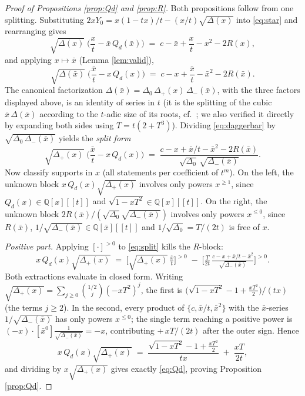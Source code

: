 \documentclass[11pt]{article}
\newcommand{\bx}{\bar x}\newcommand{\by}{\bar y}
\begin{document}
\begin{proof}[Proof of Propositions \ref{prop:Qd} and \ref{prop:R}]
Both propositions follow from one splitting. Substituting $2xY_0 = x(1-tx)/t - (x/t)\sqrt{\Delta(x)}$ into \eqref{eq:star} and rearranging gives
\begin{equation}\label{eq:dagger}
\sqrt{\Delta(x)}\;\Big(\frac{x}{t} - \bx\,Q_d(\bx)\Big) \;=\; c - \bx + \frac{x}{t} - x^{2} - 2R(x),
\end{equation}
and applying $x\mapsto\bx$ (Lemma \ref{lem:valid}),
\begin{equation}\label{eq:daggerbar}
\sqrt{\Delta(\bx)}\;\Big(\frac{\bx}{t} - x\,Q_d(x)\Big) \;=\; c - x + \frac{\bx}{t} - \bx^{2} - 2R(\bx).
\end{equation}
The canonical factorization $\Delta(\bx) = \Delta_0\,\Delta_+(x)\,\Delta_-(\bx)$, with the three factors displayed above, is an identity of series in $t$ (it is the splitting of the cubic $\bx\,\Delta(\bx)$ according to the $t$-adic size of its roots, cf.\ \cite[\S2.2]{BM05}; we also verified it directly by expanding both sides using $T=t(2+T^3)$). Dividing \eqref{eq:daggerbar} by $\sqrt{\Delta_0\,\Delta_-(\bx)}$ yields the \emph{split form}
\begin{equation}\label{eq:split}
\sqrt{\Delta_+(x)}\;\Big(\frac{\bx}{t} - x\,Q_d(x)\Big) \;=\; \frac{c - x + \bx/t - \bx^{2} - 2R(\bx)}{\sqrt{\Delta_0}\,\sqrt{\Delta_-(\bx)}}.
\end{equation}
Now classify supports in $x$ (all statements per coefficient of $t^m$). On the left, the unknown block $x\,Q_d(x)\sqrt{\Delta_+(x)}$ involves only powers $x^{\ge1}$, since $Q_d(x)\in\mathbb{Q}[x][[t]]$ and $\sqrt{1-xT^2}\in\mathbb{Q}[x][[t]]$. On the right, the unknown block $2R(\bx)/(\sqrt{\Delta_0}\sqrt{\Delta_-(\bx)})$ involves only powers $x^{\le0}$, since $R(\bx)$, $1/\sqrt{\Delta_-(\bx)}\in\mathbb{Q}[\bx][[t]]$ and $1/\sqrt{\Delta_0}=T/(2t)$ is free of $x$.

\emph{Positive part.} Applying $[\cdot]^{>0}$ to \eqref{eq:split} kills the $R$-block:
\[ x\,Q_d(x)\sqrt{\Delta_+(x)} \;=\; \Big[\sqrt{\Delta_+(x)}\,\tfrac{\bx}{t}\Big]^{>0} \;-\; \Big[\tfrac{T}{2t}\,\tfrac{c - x + \bx/t - \bx^{2}}{\sqrt{\Delta_-(\bx)}}\Big]^{>0}. \]
Both extractions evaluate in closed form. Writing $\sqrt{\Delta_+(x)} = \sum_{j\ge0}\binom{1/2}{j}(-xT^2)^j$, the first is $\big(\sqrt{1-xT^2}-1+\tfrac{xT^2}{2}\big)/(tx)$ (the terms $j\ge2$). In the second, every product of $\{c,\bx/t,\bx^2\}$ with the $\bx$-series $1/\sqrt{\Delta_-(\bx)}$ has only powers $x^{\le0}$; the single term reaching a positive power is $(-x)\cdot[\bx^0]\tfrac{1}{\sqrt{\Delta_-(\bx)}} = -x$, contributing $+\,xT/(2t)$ after the outer sign. Hence
\[ x\,Q_d(x)\sqrt{\Delta_+(x)} \;=\; \frac{\sqrt{1-xT^2}-1+\tfrac{xT^2}{2}}{tx} \;+\; \frac{xT}{2t}, \]
and dividing by $x\sqrt{\Delta_+(x)}$ gives exactly \eqref{eq:Qd}, proving Proposition \ref{prop:Qd}.


\end{proof}
\end{document}
